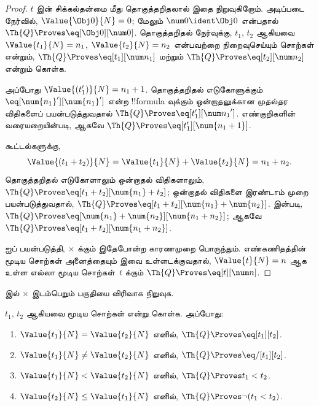 \documentclass[../../../include/open-logic-section]{subfiles}
\begin{document}
\begin{proof}
$t$ இன் சிக்கல்தன்மை மீது தொகுத்தறிதலால் இதை நிறுவுகிறோம். அடிப்படை
நேர்வில், $\Value{\Obj 0}{N} = 0$; மேலும் $\num 0 \ident \Obj 0$
என்பதால் $\Th{Q} \Proves \eq[\Obj 0][\num 0]$.
%
தொகுத்தறிதல் நேர்வுக்கு, $t_1$, $t_2$ ஆகியவை
$\Value{t_1}{N} = n_1$, $\Value{t_2}{N} = n_2$ என்பவற்றை
நிறைவுசெய்யும் சொற்கள் என்றும்,
$\Th{Q} \Proves \eq[t_1][\num n_1]$ மற்றும்
$\Th{Q} \Proves \eq[t_2][\num n_2]$ என்றும் கொள்க.

அப்போது $\Value{(t_1')}{N} = n_1 + 1$. தொகுத்தறிதல் எடுகோளுக்கும்
$\eq[\num{n_1}'][\num{n_1}']$ என்ற !!{formula} வுக்கும் ஒன்றாதலுக்கான
முதல்தர விதிகளைப் பயன்படுத்துவதால்
$\Th{Q} \Proves \eq[t_1'][{\num n_1}']$.
எண்குறிகளின் வரையறையின்படி, ஆகவே
$\Th{Q} \Proves \eq[t_1'][\num{n_1 + 1}]$.

கூட்டல்களுக்கு,
\[
      \Value{(t_1 + t_2)}{N}
    = \Value{t_1}{N} + \Value{t_2}{N}
    = n_1 + n_2.
\]
தொகுத்தறிதல் எடுகோளாலும் ஒன்றாதல் விதிகளாலும்,
$\Th{Q} \Proves \eq[t_1 + t_2][\num{n_1} + t_2]$; ஒன்றாதல் விதிகளை
இரண்டாம் முறை பயன்படுத்துவதால்,
$\Th{Q} \Proves \eq[t_1 + t_2][\num{n_1} + \num{n_2}]$.
 இன்படி,
$\Th{Q} \Proves \eq[\num{n_1} + \num{n_2}][\num{n_1 + n_2}]$;
ஆகவே $\Th{Q} \Proves \eq[t_1 + t_2][\num{n_1 + n_2}]$.

 ஐப் பயன்படுத்தி,
$\times$ க்கும் இதேபோன்ற காரணமுறை பொருந்தும்.
%
எண்கணிதத்தின் மூடிய சொற்கள் அனைத்தையும் இவை உள்ளடக்குவதால்,
$\Value{t}{N} = n$ ஆக உள்ள எல்லா மூடிய சொற்கள்~$t$ க்கும்
$\Th{Q} \Proves \eq[t][\num n]$.
\end{proof}

\begin{prob}
 இல் $\times$ இடம்பெறும் பகுதியை
விரிவாக நிறுவுக.
\end{prob}

\begin{lem}
$t_1$, $t_2$ ஆகியவை மூடிய சொற்கள் என்று கொள்க. அப்போது:
\begin{enumerate}
\item $\Value{t_1}{N} = \Value{t_2}{N}$ எனில்,
    $\Th{Q} \Proves \eq[t_1][t_2]$.
\item $\Value{t_1}{N} \neq \Value{t_2}{N}$ எனில்,
    $\Th{Q} \Proves \eq/[t_1][t_2]$.
\item $\Value{t_1}{N} < \Value{t_2}{N}$ எனில்,
    $\Th{Q} \Proves t_1 < t_2$.
\item $\Value{t_2}{N} \leq \Value{t_1}{N}$ எனில்,
    $\Th{Q} \Proves \lnot(t_1 < t_2)$.
\end{enumerate}
\end{lem}
\end{document}
